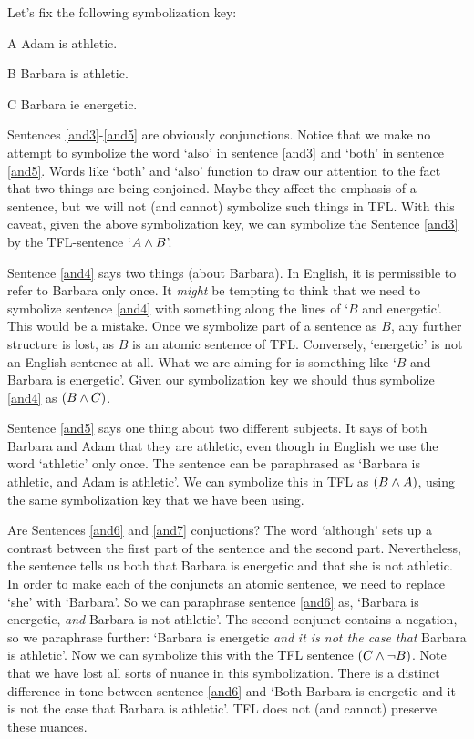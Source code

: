 Let's fix the following symbolization key:
	\begin{ekey}
		\item[A] Adam is athletic.
		\item[B] Barbara is athletic.
		\item[C] Barbara ie energetic.
	\end{ekey}
Sentences \ref{and3}-\ref{and5} are obviously conjunctions. Notice that we make no attempt to symbolize the word `also' in sentence \ref{and3} and `both' in sentence \ref{and5}. Words like `both' and `also' function to draw our attention to the fact that two things are being conjoined. Maybe they affect the emphasis of a sentence, but we will not (and cannot) symbolize such things in TFL. With this caveat, given the above symbolization key, we can symbolize the Sentence \ref{and3} by the TFL-sentence `$A\mathbin{\wedge} B$'.

Sentence \ref{and4} says two things (about Barbara). In English, it is permissible to refer to Barbara only once. It \emph{might} be tempting to think that we need to symbolize sentence \ref{and4} with something along the lines of `$B$ and energetic'. This would be a mistake. Once we symbolize part of a sentence as $B$, any further structure is lost, as $B$ is an atomic sentence of TFL. Conversely, `energetic' is not an English sentence at all. What we are aiming for is something like `$B$ and Barbara is energetic'. Given our symbolization key we should thus symbolize \ref{and4} as $(B\mathbin{\wedge} C)$.

Sentence \ref{and5} says one thing about two different subjects. It says of both Barbara and Adam that they are athletic, even though in English we use the word `athletic' only once. The sentence can be paraphrased as `Barbara is athletic, and Adam is athletic'. We can symbolize this in TFL as $(B\mathbin{\wedge} A)$, using the same symbolization key that we have been using.

Are Sentences \ref{and6} and \ref{and7} conjuctions? The word `although' sets up a contrast between the first part of the sentence and the second part. Nevertheless, the sentence tells us both that Barbara is energetic and that she is not athletic. In order to make each of the conjuncts an atomic sentence, we need to replace `she' with `Barbara'. So we can paraphrase sentence \ref{and6} as, `Barbara is energetic, \emph{and} Barbara is not athletic'. The second conjunct contains a negation, so we paraphrase further: `Barbara is energetic \emph{and} \emph{it is not the case that} Barbara is athletic'. Now we can symbolize this with the TFL sentence $(C\mathbin{\wedge}\neg B)$. Note that we have lost all sorts of nuance in this symbolization. There is a distinct difference in tone between sentence \ref{and6} and `Both Barbara is energetic and it is not the case that Barbara is athletic'. TFL does not (and cannot) preserve these nuances.

